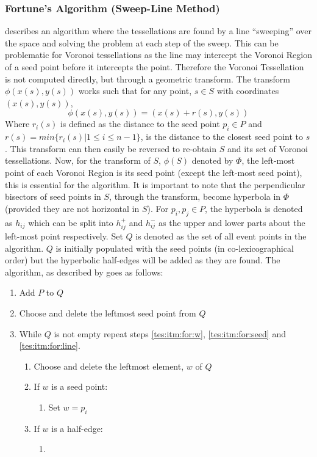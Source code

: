 \subsubsection{Fortune's Algorithm (Sweep-Line Method)}\label{tes:ssec:fort}
\cite{fortune1987sweepline} describes an algorithm where the tessellations are found by a line ``sweeping'' over the space and solving the problem at each step of the sweep. This can be problematic for Voronoi tessellations as the line may intercept the Voronoi Region of a seed point before it intercepts the point. Therefore the Voronoi Tessellation is not computed directly, but through a geometric transform. The transform $\phi(x(s),y(s))$ works such that for any point, $s \in S$ with coordinates $(x(s),y(s))$, 
\begin{equation}
  \phi(x(s),y(s)) = (x(s) + r(s), y(s))
\end{equation}
Where $r_i(s)$ is defined as the distance to the seed point $p_i \in P$ and $r(s) = min\{r_i(s) | 1 \leq i \leq n-1\}$, is the distance to the closest seed point to $s$. This transform can then easily be reversed to re-obtain $S$ and its set of Voronoi tessellations. Now, for the transform of $S$, $\phi(S)$ denoted by $\Phi$, the left-most point of each Voronoi Region is its seed point (except the left-most seed point), this is essential for the algorithm. It is important to note that the perpendicular bisectors of seed points in $S$, through the transform, become hyperbola in $\Phi$ (provided they are not horizontal in $S$). For $p_i,p_j\in P$, the hyperbola is denoted as $h_{ij}$ which can be split into $h^+_{ij}$ and $h^-_{ij}$ as the upper and lower parts about the left-most point respectively. Set $Q$ is denoted as the set of all event points in the algorithm. $Q$ is initially populated with the seed points (in co-lexicographical order) but the hyperbolic half-edges will be added as they are found. The algorithm, as described by \cite{okabe2009spatial} goes as follows:
\begin{enumerate}
\item Add $P$ to $Q$
\item Choose and delete the leftmost seed point from $Q$
\item While $Q$ is not empty repeat steps \ref{tes:itm:for:w}, \ref{tes:itm:for:seed} and \ref{tes:itm:for:line}.
\begin{enumerate}
  \item\label{tes:itm:for:w} Choose and delete the leftmost element, $w$ of $Q$
  \item\label{tes:itm:for:seed} If $w$ is a seed point:
  \begin{enumerate}
    \item Set $w=p_i$
    
  \end{enumerate}
  \item\label{tes:itm:for:line} If $w$ is a half-edge:
  \begin{enumerate}
    \item 
  \end{enumerate}
\end{enumerate}
\end{enumerate}

